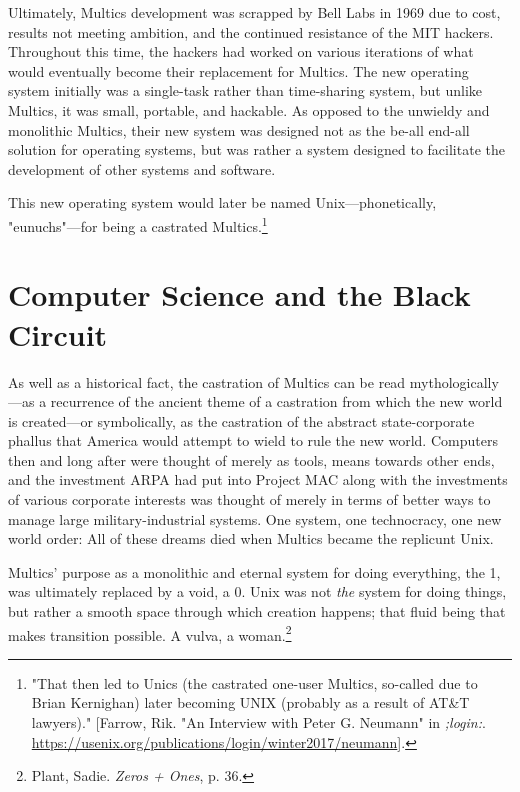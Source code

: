 \documentclass[10pt, statementpaper, twoside, openright]{memoir}
\begin{document}
Ultimately, Multics development was scrapped by Bell Labs in 1969 due to cost, results not meeting ambition, and the continued resistance of the MIT hackers. Throughout this time, the hackers had worked on various iterations of what would eventually become their replacement for Multics. The new operating system initially was a single-task rather than time-sharing system, but unlike Multics, it was small, portable, and hackable. As opposed to the unwieldy and monolithic Multics, their new system was designed not as the be-all end-all solution for operating systems, but was rather a system designed to facilitate the development of other systems and software.

This new operating system would later be named Unix---phonetically, "eunuchs"---for being a castrated Multics.\footnote{"That then led to Unics (the castrated one-user Multics, so-called due to Brian Kernighan) later becoming UNIX (probably as a result of AT\&T lawyers)." [Farrow, Rik. "An Interview with Peter G. Neumann" in \textit{;login:}. \href{https://www.usenix.org/publications/login/winter2017/neumann}{https://usenix.org/publications/login/winter2017/neumann}].}

\chapter{Computer Science and the Black Circuit}

As well as a historical fact, the castration of Multics can be read mythologically---as a recurrence of the ancient theme of a castration from which the new world is created---or symbolically, as the castration of the abstract state-corporate phallus that America would attempt to wield to rule the new world. Computers then and long after were thought of merely as tools, means towards other ends, and the investment ARPA had put into Project MAC along with the investments of various corporate interests was thought of merely in terms of better ways to manage large military-industrial systems. One system, one technocracy, one new world order: All of these dreams died when Multics became the replicunt Unix.

Multics' purpose as a monolithic and eternal system for doing everything, the 1, was ultimately replaced by a void, a 0. Unix was not \emph{the} system for doing things, but rather a smooth space through which creation happens; that fluid being that makes transition possible. A vulva, a woman.\footnote{Plant, Sadie. \textit{Zeros + Ones}, p. 36.}
\end{document}
